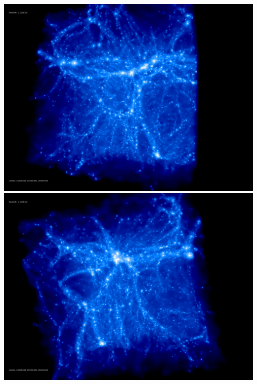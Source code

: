 \includegraphics[scale=0.1]{stages_12/rotate_00074.jpg} 
\includegraphics[scale=0.1]{stages_12/rotate_00131.jpg}

